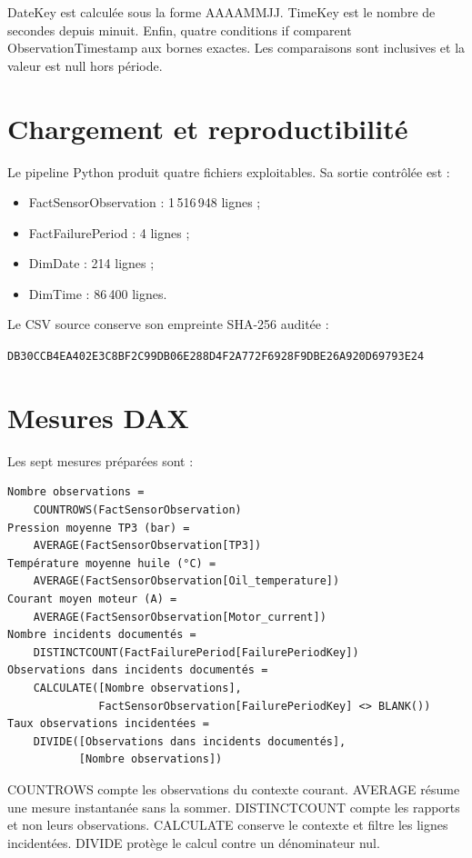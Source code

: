 DateKey est calculée sous la forme AAAAMMJJ. TimeKey est le nombre de secondes depuis minuit. Enfin, quatre conditions if comparent ObservationTimestamp aux bornes exactes. Les comparaisons sont inclusives et la valeur est null hors période.

\section{Chargement et reproductibilité}
Le pipeline Python produit quatre fichiers exploitables. Sa sortie contrôlée est :
\begin{itemize}
\item FactSensorObservation : 1\,516\,948 lignes ;
\item FactFailurePeriod : 4 lignes ;
\item DimDate : 214 lignes ;
\item DimTime : 86\,400 lignes.
\end{itemize}
Le CSV source conserve son empreinte SHA-256 auditée :
\begin{center}
\small\texttt{DB30CCB4EA402E3C8BF2C99DB06E288D4F2A772F6928F9DBE26A920D69793E24}
\end{center}

\section{Mesures DAX}
Les sept mesures préparées sont :
\begin{lstlisting}[language={},caption={Catalogue DAX du projet}]
Nombre observations =
    COUNTROWS(FactSensorObservation)
Pression moyenne TP3 (bar) =
    AVERAGE(FactSensorObservation[TP3])
Température moyenne huile (°C) =
    AVERAGE(FactSensorObservation[Oil_temperature])
Courant moyen moteur (A) =
    AVERAGE(FactSensorObservation[Motor_current])
Nombre incidents documentés =
    DISTINCTCOUNT(FactFailurePeriod[FailurePeriodKey])
Observations dans incidents documentés =
    CALCULATE([Nombre observations],
              FactSensorObservation[FailurePeriodKey] <> BLANK())
Taux observations incidentées =
    DIVIDE([Observations dans incidents documentés],
           [Nombre observations])
\end{lstlisting}
COUNTROWS compte les observations du contexte courant. AVERAGE résume une mesure instantanée sans la sommer. DISTINCTCOUNT compte les rapports et non leurs observations. CALCULATE conserve le contexte et filtre les lignes incidentées. DIVIDE protège le calcul contre un dénominateur nul.

